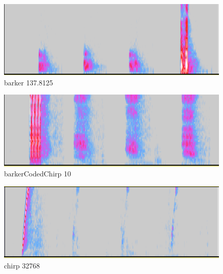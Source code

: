 \begin{figure}[p]
  \centering
  \includegraphics[clip,width=1.05\hsize]{img/barker_137-8125.png}
  \caption{barker 137.8125}\label{fig:barkerZ137Z8125}
\end{figure}

\begin{figure}[p]
  \centering
  \includegraphics[clip,width=1.05\hsize]{img/barkerCodedChirp_10.png}
  \caption{barkerCodedChirp 10}\label{fig:barkerCodedChirpZ10}
\end{figure}

\begin{figure}[p]
  \centering
  \includegraphics[clip,width=1.05\hsize]{img/chirp_32768.png}
  \caption{chirp 32768}\label{fig:chirpZ32768}
\end{figure}





